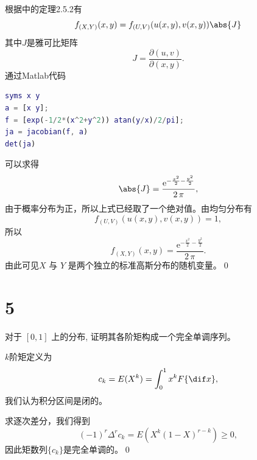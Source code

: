 \documentclass[12pt,a4]{ctexart}
\begin{document}
根据\cite[P91]{THU-stat}中的定理2.5.2有
\begin{equation}
	f_{(X,Y)}(x,y) =f_{(U,V)} (u(x,y),v(x,y)) \abs{J}
\end{equation}
其中$J$是雅可比矩阵
\begin{equation}
	J = \frac{\partial (u,v)}{\partial (x,y)}.
\end{equation}
通过{Matlab}代码
\begin{lstlisting}[language=matlab]
syms x y
a = [x y];
f = [exp(-1/2*(x^2+y^2)) atan(y/x)/2/pi];
ja = jacobian(f, a)
det(ja)	
\end{lstlisting}
可以求得
\begin{equation}
	\abs{J} = \frac{{\mathrm{e}}^{-\frac{x^2 }{2}-\frac{y^2 }{2}} }{2\,\pi },
\end{equation}
由于概率分布为正，所以上式已经取了一个绝对值。由均匀分布有
\begin{equation}
	f_{(U,V)} (u(x,y),v(x,y)) = 1,
\end{equation}
所以
\begin{equation}
	f_{(X,Y)}(x,y) = \frac{{\mathrm{e}}^{-\frac{x^2 }{2}-\frac{y^2 }{2}} }{2\,\pi }.
\end{equation}
由此可见$X$ 与 $Y$ 是两个独立的标准高斯分布的随机变量。\qed


\section{5}

对于 $[0,1]$ 上的分布, 证明其各阶矩构成一个完全单调序列。


$k$阶矩定义为\cite[P196]{feller}
\begin{equation}
	c_k = E(X^k) = \int^1_0 x^k F\{\dif x\},
\end{equation}
我们认为积分区间是闭的。

求逐次差分，我们得到
\begin{equation}
	(-1)^r \Delta^r c_k = E(X^k(1-X)^{r-k})\geqslant 0,
\end{equation}
因此矩数列$\{c_k\}$是完全单调的。\qed



\end{document}
